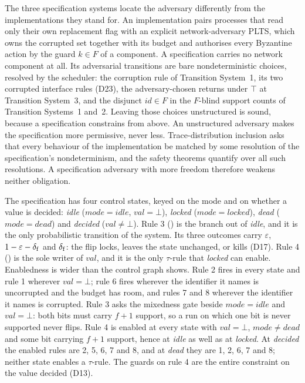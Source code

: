 The three specification systems locate the adversary differently from the
implementations they stand for.
An implementation pairs processes that read only their own replacement flag with
an explicit network-adversary PLTS, which owns the corrupted set together with
its budget and authorises every Byzantine action by the guard $k \in F$ of a
component.
A specification carries no network component at all.
Its adversarial transitions are bare nondeterministic choices, resolved by the
scheduler: the corruption rule of Transition System~1, its two corrupted
interface rules (D23), the adversary-chosen returns under $\top$ at Transition
System~3, and the disjunct $id \in F$ in the $F$-blind support counts of
Transition Systems~1 and~2.
Leaving those choices unstructured is sound, because a specification constrains
from above.
An unstructured adversary makes the specification more permissive, never less.
Trace-distribution inclusion asks that every behaviour of the implementation be
matched by some resolution of the specification's nondeterminism, and the safety
theorems quantify over all such resolutions.
A specification adversary with more freedom therefore weakens neither
obligation.



The specification has four control states, keyed on the mode and on whether a value is decided: \emph{idle} ($mode = idle$, $val = \bot$), \emph{locked} ($mode = locked$), \emph{dead} ($mode = dead$) and \emph{decided} ($val \neq \bot$).
Rule 3 () is the branch out of \emph{idle}, and it is the only probabilistic transition of the system.
Its three outcomes carry $\varepsilon$, $1-\varepsilon-\delta_{\mathrm{f}}$ and $\delta_{\mathrm{f}}$: the flip locks, leaves the state unchanged, or kills (D17).
Rule 4 () is the sole writer of $val$, and it is the only $\tau$-rule that \emph{locked} can enable.
Enabledness is wider than the control graph shows.
Rule 2 fires in every state and rule 1 wherever $val = \bot$; rule 6 fires wherever the identifier it names is uncorrupted and the budget has room, and rules 7 and 8 wherever the identifier it names is corrupted.
Rule 3 asks the mixedness gate beside $mode = idle$ and $val = \bot$: both bits must carry $f{+}1$ support, so a run on which one bit is never supported never flips.
Rule 4 is enabled at every state with $val = \bot$, $mode \neq dead$ and some bit carrying $f{+}1$ support, hence at \emph{idle} as well as at \emph{locked}.
At \emph{decided} the enabled rules are 2, 5, 6, 7 and 8, and at \emph{dead} they are 1, 2, 6, 7 and 8; neither state enables a $\tau$-rule.
The guards on rule 4 are the entire constraint on the value decided (D13).


